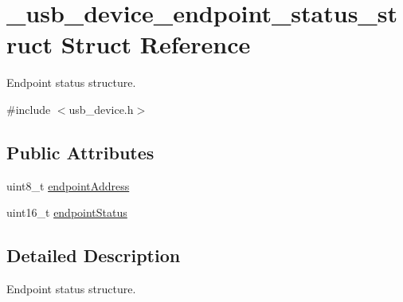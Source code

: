 \hypertarget{struct__usb__device__endpoint__status__struct}{\section{\-\_\-usb\-\_\-device\-\_\-endpoint\-\_\-status\-\_\-struct Struct Reference}
\label{struct__usb__device__endpoint__status__struct}
}


Endpoint status structure.  




{\ttfamily \#include $<$usb\-\_\-device.\-h$>$}

\subsection*{Public Attributes}
\begin{DoxyCompactItemize}
\item 
uint8\-\_\-t \hyperlink{struct__usb__device__endpoint__status__struct_afada98f49022f451e7d682513e92993f}{endpoint\-Address}
\item 
uint16\-\_\-t \hyperlink{struct__usb__device__endpoint__status__struct_a5b41ac50b0851879961061170630dc88}{endpoint\-Status}
\end{DoxyCompactItemize}


\subsection{Detailed Description}
Endpoint status structure. 

